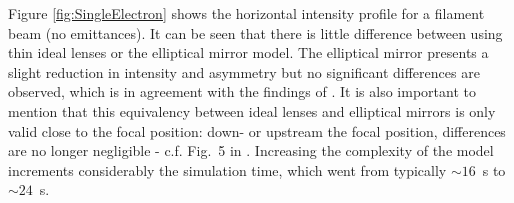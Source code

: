 \documentclass{iucr}              %
\begin{document}


Figure \ref{fig:SingleElectron} shows the horizontal intensity profile for a filament beam (no emittances). It can be seen that there is little difference between using thin ideal lenses or the elliptical mirror model. The elliptical mirror presents a slight reduction in intensity and asymmetry but no significant differences are observed, which is in agreement with the findings of \cite{Canestrari2014}. It is also important to mention that this equivalency between ideal lenses and elliptical mirrors is only valid close to the focal position: down- or upstream the focal position, differences are no longer negligible - c.f. Fig.~5 in \cite{Canestrari2014}.  Increasing the complexity of the model increments considerably the simulation time, which went from typically $\sim16$~s to $\sim24$~s. 

\end{document}
